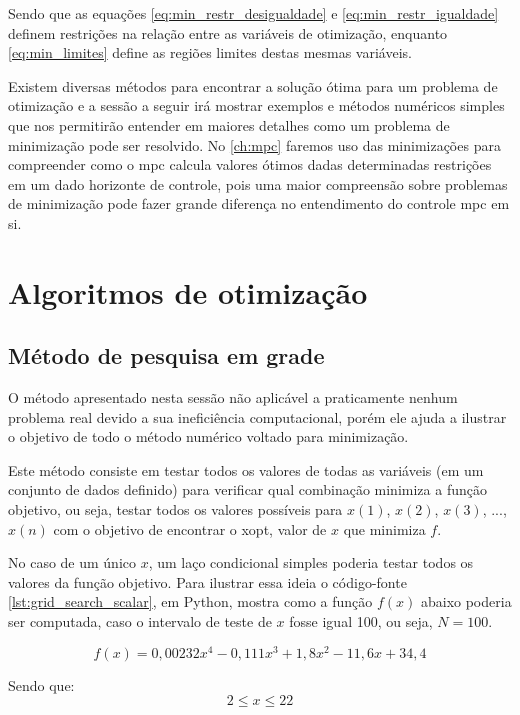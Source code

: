 Sendo que as equações \ref{eq:min_restr_desigualdade} e \ref{eq:min_restr_igualdade}
definem restrições na relação entre as variáveis de otimização, enquanto
\ref{eq:min_limites} define as regiões limites destas mesmas variáveis.

Existem diversas métodos para encontrar a solução ótima para um problema de otimização
e a sessão a seguir irá mostrar exemplos e métodos numéricos simples que nos permitirão
entender em maiores detalhes como um problema de minimização pode ser resolvido. No
\cref{ch:mpc} faremos uso das minimizações para compreender como o \acrshort{mpc}
calcula valores ótimos dadas determinadas restrições em um dado horizonte de controle,
pois uma maior compreensão sobre problemas de minimização pode fazer grande diferença
no entendimento do controle \acrshort{mpc} em si.

\section{Algoritmos de otimização}

\subsection{Método de pesquisa em grade}

O método apresentado nesta sessão não aplicável a praticamente nenhum problema real
devido a sua ineficiência computacional, porém ele ajuda a ilustrar o objetivo de
todo o método numérico voltado para minimização.

Este método consiste em testar todos os valores de todas as variáveis (em um conjunto
de dados definido) para verificar qual combinação minimiza a função objetivo, ou seja,
testar todos os valores possíveis para $x(1)$, $x(2)$, $x(3)$, $...$, $x(n)$ com o
objetivo de encontrar o \gls{xopt}, valor de $x$ que minimiza $f$.

No caso de um único $x$, um laço condicional simples poderia testar todos os valores da
função objetivo. Para ilustrar essa ideia o código-fonte \ref{lst:grid_search_scalar}, em
Python, mostra como a função $f(x)$ abaixo poderia ser computada, caso o intervalo de
teste de $x$ fosse igual 100, ou seja, $N = 100$.

\begin{equation}
	\label{eq:grid_search_scalar}
	f(x) = 0,00232x^4 - 0,111x^3 + 1,8x^2 - 11,6x + 34,4
\end{equation}

Sendo que:
\[	2 \leq x \leq 22 \]

